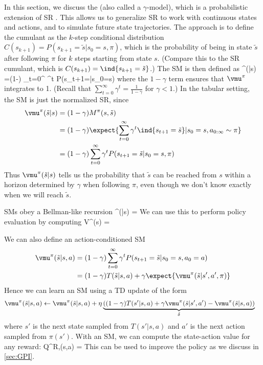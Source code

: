 In this section, we discuss the 
(also called a $\gamma$-model),
which is a probabilistic extension of SR
\citep{Janner2020,Eysenbach2021}.
This allows us
to generalize SR to work with continuous states and actions,
and to simulate future state trajectories.
The approach is to define the cumulant as the $k$-step conditional
distribution $C(s_{k+1}) = P(s_{k+1}=\tilde{s}|s_0=s,\pi)$,
which is the probability of being in state $\tilde{s}$
after following $\pi$ for $k$ steps starting from
state $s$. (Compare this to the SR cumulant,
which is $C(s_{k+1})=\ind{s_{k+1}=\tilde{s}}$.)
The SM is then defined as
\be
\vmu^{\pi}(|s)
=(1-\gamma) \sum_{t=0}^{\infty} \gamma^t P(s_{t+1}=|s_0=s)
\ee
where the $1-\gamma$ term ensures that $\vmu^{\pi}$ integrates to 1.
(Recall that $\sum_{t=0}^{\infty} \gamma^t = \frac{1}{1-\gamma}$ for $\gamma<1$.)
In the tabular setting, the SM is just the normalized SR,
since
\begin{align}
\vmu^{\pi}(\tilde{s}|s)
&=(1-\gamma) M^{\pi}(s,\tilde{s}) \\
&=(1-\gamma) \expect{\sum_{t=0}^{\infty} \gamma^t \ind{s_{t+1}=\tilde{s}}
  |s_0=s, a_{0:\infty} \sim \pi} \\
&= (1-\gamma) \sum_{t=0}^{\infty} \gamma^t P(s_{t+1}=\tilde{s}|s_0=s, \pi)
\end{align}
Thus $\vmu^{\pi}(\tilde{s}|s)$
tells us the probability that $\tilde{s}$ can be reached from $s$
within a horizon determined by $\gamma$ when  following $\pi$,
even though we don't know exactly when we will reach $\tilde{s}$.

SMs obey a Bellman-like recursion
\be
\vmu^{\pi}(|s) = 
\ee
We can use this to perform policy evaluation by computing
\be
V^{\pi}(s) = 
\ee

We can also define an action-conditioned SM
\begin{align}
\vmu^{\pi}(\tilde{s}|s,a)
&=(1-\gamma) \sum_{t=0}^{\infty} \gamma^t P(s_{t+1}=\tilde{s}|s_0=s,a_0=a) \\
&=(1-\gamma) T(\tilde{s}|s,a) + \gamma \expect{\vmu^{\pi}(\tilde{s}|s',a',\pi)}
\end{align}
Hence we can learn an SM using a TD update of the form
\begin{align}
  \vmu^{\pi}(\tilde{s}|s,a) &\leftarrow
  \vmu^{\pi}(\tilde{s}|s,a) + \eta 
  \underbrace{\left( (1-\gamma) T(s'|s,a)
    + \gamma \vmu^{\pi}(\tilde{s}|s',a')
    - \vmu^{\pi}(\tilde{s}|s,a) \right)}_{\delta}
  \label{eqn:SMQTD}
\end{align}
where $s'$ is the next state sampled from $T(s'|s,a)$
and $a'$ is the next action sampled from $\pi(s')$.
With an SM, we can  compute the state-action value
for any reward:
\be
Q^{R,\pi}(s,a) = 
\ee
This can be used to improve the policy as we discuss
in \cref{sec:GPI}.



